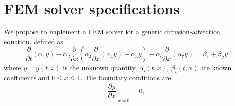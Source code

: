 \section{FEM solver specifications} %
\label{sec:fem_solver}

We propose to implement a FEM solver for a generic diffusion-advection equation, defined as
\begin{equation}
\frac{\partial }{{\partial t}}\left( {{\alpha _1}y} \right) - {\alpha _2}\frac{\partial }{{\partial x}}\left( {{\alpha _3}\frac{\partial }{{\partial x}}\left( {{\alpha _4}y} \right) + {\alpha _5}y} \right) - {\alpha _6}\frac{\partial }{{\partial x}}\left( {{\alpha _7}y} \right) = {\beta _1} + {\beta _2}y
\end{equation}
where $y = y\left( t, x \right)$ is the unknown quantity, $\alpha_i\left( t, x \right)$, $\beta_i\left( t, x \right)$ are known coefficients and $0\leq x \leq 1$. The boundary conditions are
\begin{equation}
{\left. {\frac{{\partial y}}{{\partial x}}} \right|_{x = 0}} = 0,
\end{equation}
